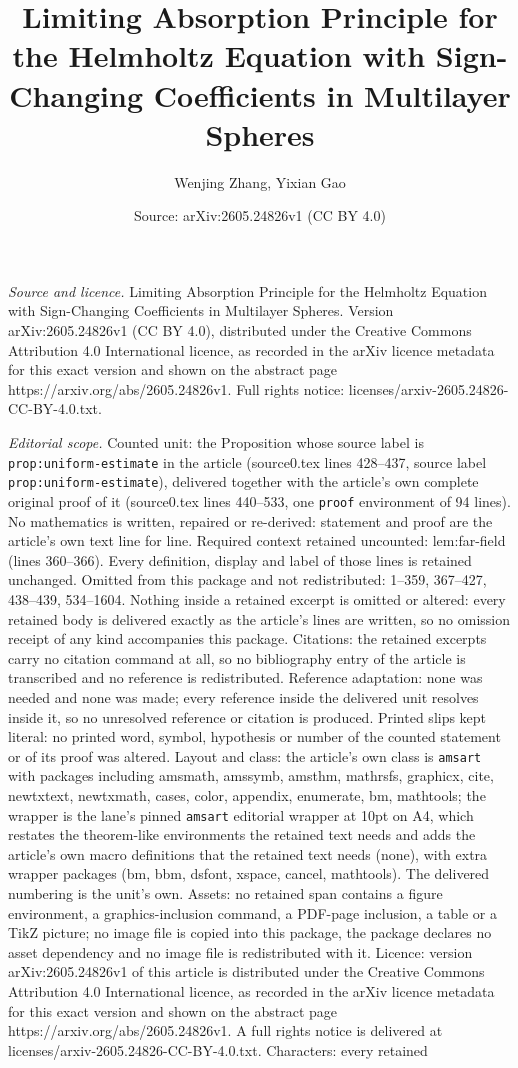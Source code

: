 \documentclass[10pt,a4paper]{amsart}
\title[Limiting Absorption Principle for the Helmholtz Equation wit]{Limiting Absorption Principle for the Helmholtz Equation with Sign-Changing Coefficients in Multilayer Spheres}
\author{Wenjing Zhang, Yixian Gao}
\date{Source: arXiv:2605.24826v1 (CC BY 4.0)}
\begin{document}
\maketitle

\noindent\emph{Source and licence.} Limiting Absorption Principle for the Helmholtz Equation with Sign-Changing Coefficients in Multilayer Spheres. Version arXiv:2605.24826v1 (CC BY 4.0), distributed under the Creative Commons Attribution 4.0 International licence, as recorded in the arXiv licence metadata for this exact version and shown on the abstract page https://arxiv.org/abs/2605.24826v1. Full rights notice: licenses/arxiv-2605.24826-CC-BY-4.0.txt.\par\smallskip

\noindent\textit{Editorial scope.} Counted unit: the Proposition whose source label is \texttt{prop:uniform-estimate} in the article (source0.tex lines 428--437, source label \texttt{prop:uniform-estimate}), delivered together with the article's own complete original proof of it (source0.tex lines 440--533, one \texttt{proof} environment of 94 lines). No mathematics is written, repaired or re-derived: statement and proof are the article's own text line for line. Required context retained uncounted: lem:far-field (lines 360--366). Every definition, display and label of those lines is retained unchanged. Omitted from this package and not redistributed: 1--359, 367--427, 438--439, 534--1604. Nothing inside a retained excerpt is omitted or altered: every retained body is delivered exactly as the article's lines are written, so no omission receipt of any kind accompanies this package. Citations: the retained excerpts carry no citation command at all, so no bibliography entry of the article is transcribed and no reference is redistributed. Reference adaptation: none was needed and none was made; every reference inside the delivered unit resolves inside it, so no unresolved reference or citation is produced. Printed slips kept literal: no printed word, symbol, hypothesis or number of the counted statement or of its proof was altered. Layout and class: the article's own class is \texttt{amsart} with packages including amsmath, amssymb, amsthm, mathrsfs, graphicx, cite, newtxtext, newtxmath, cases, color, appendix, enumerate, bm, mathtools; the wrapper is the lane's pinned \texttt{amsart} editorial wrapper at 10pt on A4, which restates the theorem-like environments the retained text needs and adds the article's own macro definitions that the retained text needs (none), with extra wrapper packages (bm, bbm, dsfont, xspace, cancel, mathtools). The delivered numbering is the unit's own. Assets: no retained span contains a figure environment, a graphics-inclusion command, a PDF-page inclusion, a table or a TikZ picture; no image file is copied into this package, the package declares no asset dependency and no image file is redistributed with it. Licence: version arXiv:2605.24826v1 of this article is distributed under the Creative Commons Attribution 4.0 International licence, as recorded in the arXiv licence metadata for this exact version and shown on the abstract page https://arxiv.org/abs/2605.24826v1. A full rights notice is delivered at licenses/arxiv-2605.24826-CC-BY-4.0.txt. Characters: every retained 
\end{document}
